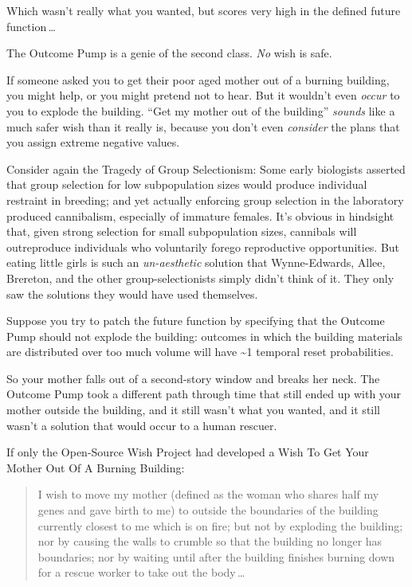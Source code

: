  Which wasn't really what you wanted, but scores
very high in the defined future function\,\ldots


 The Outcome Pump is a genie of the second class. \textit{No} wish
is safe.


 If someone asked you to get their poor aged mother out of a
burning building, you might help, or you might pretend not to hear. But
it wouldn't even \textit{occur} to you to explode the
building. ``Get my mother out of the
building'' \textit{sounds} like a much safer wish
than it really is, because you don't even
\textit{consider} the plans that you assign extreme negative values.


 Consider again the Tragedy of Group Selectionism: Some early
biologists asserted that group selection for low subpopulation sizes
would produce individual restraint in breeding; and yet actually
enforcing group selection in the laboratory produced cannibalism,
especially of immature females. It's obvious in
hindsight that, given strong selection for small subpopulation sizes,
cannibals will outreproduce individuals who voluntarily forego
reproductive opportunities. But eating little girls is such an
\textit{un-aesthetic} solution that Wynne-Edwards, Allee, Brereton, and
the other group-selectionists simply didn't think of
it. They only saw the solutions they would have used themselves.


 Suppose you try to patch the future function by specifying that
the Outcome Pump should not explode the building: outcomes in which the
building materials are distributed over too much volume will have \~{}1
temporal reset probabilities.


 So your mother falls out of a second-story window and breaks her
neck. The Outcome Pump took a different path through time that still
ended up with your mother outside the building, and it still
wasn't what you wanted, and it still
wasn't a solution that would occur to a human rescuer.


 If only the Open-Source Wish Project had developed a Wish To Get
Your Mother Out Of A Burning Building:

\begin{quote}
{
 I wish to move my mother (defined as the woman who shares half my
genes and gave birth to me) to outside the boundaries of the building
currently closest to me which is on fire; but not by exploding the
building; nor by causing the walls to crumble so that the building no
longer has boundaries; nor by waiting until after the building finishes
burning down for a rescue worker to take out the body\,\ldots}
\end{quote}


